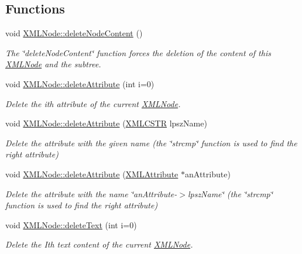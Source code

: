 \subsection*{Functions}
\begin{DoxyCompactItemize}
\item 
void \hyperlink{group__xmlDelete_gaa4d133999da220e916bdf3a969d493c4}{X\-M\-L\-Node\-::delete\-Node\-Content} ()
\begin{DoxyCompactList}\small\item\em The \char`\"{}delete\-Node\-Content\char`\"{} function forces the deletion of the content of this \hyperlink{structXMLNode}{X\-M\-L\-Node} and the subtree. \end{DoxyCompactList}\item 
void \hyperlink{group__xmlDelete_ga61b2405305063594b35b309cc2e22c01}{X\-M\-L\-Node\-::delete\-Attribute} (int i=0)
\begin{DoxyCompactList}\small\item\em Delete the ith attribute of the current \hyperlink{structXMLNode}{X\-M\-L\-Node}. \end{DoxyCompactList}\item 
void \hyperlink{group__xmlDelete_ga2b21339e5b370f1d7ebde2dc51217eed}{X\-M\-L\-Node\-::delete\-Attribute} (\hyperlink{xmlParser_8h_acdb0d6fd8dd596384b438d86cfb2b182}{X\-M\-L\-C\-S\-T\-R} lpsz\-Name)
\begin{DoxyCompactList}\small\item\em Delete the attribute with the given name (the \char`\"{}strcmp\char`\"{} function is used to find the right attribute) \end{DoxyCompactList}\item 
void \hyperlink{group__xmlDelete_ga6f00d7c1b4eaa29cfdd9d4a709495aca}{X\-M\-L\-Node\-::delete\-Attribute} (\hyperlink{structXMLAttribute}{X\-M\-L\-Attribute} $\ast$an\-Attribute)
\begin{DoxyCompactList}\small\item\em Delete the attribute with the name \char`\"{}an\-Attribute-\/$>$lpsz\-Name\char`\"{} (the \char`\"{}strcmp\char`\"{} function is used to find the right attribute) \end{DoxyCompactList}\item 
void \hyperlink{group__xmlDelete_ga14a49a23735ea10a44864cb6b4302250}{X\-M\-L\-Node\-::delete\-Text} (int i=0)
\begin{DoxyCompactList}\small\item\em Delete the Ith text content of the current \hyperlink{structXMLNode}{X\-M\-L\-Node}. \end{DoxyCompactList}\item 

\end{DoxyCompactItemize}
